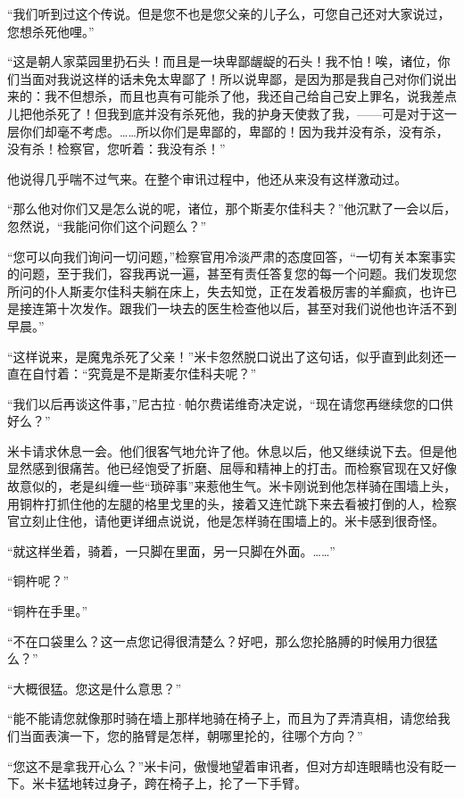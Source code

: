 \par “我们听到过这个传说。但是您不也是您父亲的儿子么，可您自己还对大家说过，您想杀死他哩。”
\par “这是朝人家菜园里扔石头！而且是一块卑鄙龌龊的石头！我不怕！唉，诸位，你们当面对我说这样的话未免太卑鄙了！所以说卑鄙，是因为那是我自己对你们说出来的：我不但想杀，而且也真有可能杀了他，我还自己给自己安上罪名，说我差点儿把他杀死了！但我到底并没有杀死他，我的护身天使救了我，——可是对于这一层你们却毫不考虑。……所以你们是卑鄙的，卑鄙的！因为我并没有杀，没有杀，没有杀！检察官，您听着：我没有杀！”
\par 他说得几乎喘不过气来。在整个审讯过程中，他还从来没有这样激动过。
\par “那么他对你们又是怎么说的呢，诸位，那个斯麦尔佳科夫？”他沉默了一会以后，忽然说，“我能问你们这个问题么？”
\par “您可以向我们询问一切问题，”检察官用冷淡严肃的态度回答，“一切有关本案事实的问题，至于我们，容我再说一遍，甚至有责任答复您的每一个问题。我们发现您所问的仆人斯麦尔佳科夫躺在床上，失去知觉，正在发着极厉害的羊癫疯，也许已是接连第十次发作。跟我们一块去的医生检查他以后，甚至对我们说他也许活不到早晨。”
\par “这样说来，是魔鬼杀死了父亲！”米卡忽然脱口说出了这句话，似乎直到此刻还一直在自忖着：“究竟是不是斯麦尔佳科夫呢？”
\par “我们以后再谈这件事，”尼古拉·帕尔费诺维奇决定说，“现在请您再继续您的口供好么？”
\par 米卡请求休息一会。他们很客气地允许了他。休息以后，他又继续说下去。但是他显然感到很痛苦。他已经饱受了折磨、屈辱和精神上的打击。而检察官现在又好像故意似的，老是纠缠一些“琐碎事”来惹他生气。米卡刚说到他怎样骑在围墙上头，用铜杵打抓住他的左腿的格里戈里的头，接着又连忙跳下来去看被打倒的人，检察官立刻止住他，请他更详细点说说，他是怎样骑在围墙上的。米卡感到很奇怪。
\par “就这样坐着，骑着，一只脚在里面，另一只脚在外面。……”
\par “铜杵呢？”
\par “铜杵在手里。”
\par “不在口袋里么？这一点您记得很清楚么？好吧，那么您抡胳膊的时候用力很猛么？”
\par “大概很猛。您这是什么意思？”
\par “能不能请您就像那时骑在墙上那样地骑在椅子上，而且为了弄清真相，请您给我们当面表演一下，您的胳臂是怎样，朝哪里抡的，往哪个方向？”
\par “您这不是拿我开心么？”米卡问，傲慢地望着审讯者，但对方却连眼睛也没有眨一下。米卡猛地转过身子，跨在椅子上，抡了一下手臂。
